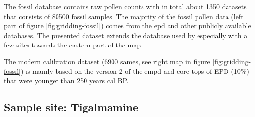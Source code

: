 \begin{refsection}
The fossil database contains raw pollen counts with in total about 1350 datasets that consists of 80500 fossil samples. The majority of the fossil pollen data (left part of figure \ref{fig:gridding-fossil}) comes from the \gls{epd} \citep[ca. 94\%]{FyfeBeaulieuBinneyEtAl2009} and other publicly available databases. The presented dataset extends the database used by \cite{MauriDavisCollinsEtAl2015} especially with a few sites towards the eastern part of the map.

The modern calibration dataset (6900 sames, see right map in figure \ref{fig:gridding-fossil}) is mainly based on the version 2 of the \gls{empd} \citep[ca. 87\%, see also chapter \ref{chp:empd}]{DavisZanonCollinsEtAl2013} and core tops of EPD (10\%) that were younger than 250 years cal BP.


\subsection{Sample site: Tigalmamine} \label{sec:gridding-sample-site}


\end{refsection}
